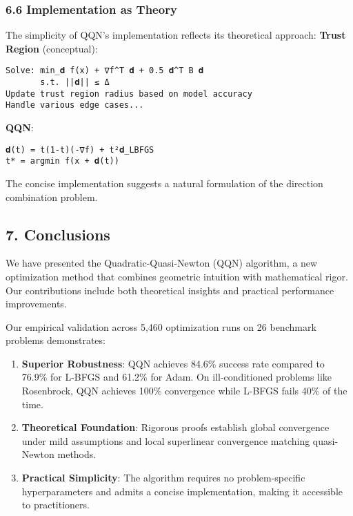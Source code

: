\hypertarget{implementation-as-theory}{%
\subsubsection{6.6 Implementation as Theory}\label{implementation-as-theory}}

The simplicity of QQN's implementation reflects its theoretical approach:
\textbf{Trust Region} (conceptual):

\begin{verbatim}
Solve: min_𝐝 f(x) + ∇f^T 𝐝 + 0.5 𝐝^T B 𝐝
       s.t. ||𝐝|| ≤ Δ
Update trust region radius based on model accuracy
Handle various edge cases...
\end{verbatim}

\textbf{QQN}:

\begin{verbatim}
𝐝(t) = t(1-t)(-∇f) + t²𝐝_LBFGS
t* = argmin f(x + 𝐝(t))
\end{verbatim}

The concise implementation suggests a natural formulation of the direction combination problem.

\hypertarget{conclusions}{%
\subsection{7. Conclusions}\label{conclusions}}

We have presented the Quadratic-Quasi-Newton (QQN) algorithm, a new optimization method that combines geometric
intuition with mathematical rigor. Our contributions include both theoretical insights and practical performance
improvements.

Our empirical validation across 5,460 optimization runs on 26 benchmark problems demonstrates:

\begin{enumerate}
\def\labelenumi{\arabic{enumi}.}
\item
  \textbf{Superior Robustness}: QQN achieves 84.6\% success rate compared to 76.9\% for L-BFGS and 61.2\% for Adam. On
  ill-conditioned problems like Rosenbrock, QQN achieves 100\% convergence while L-BFGS fails 40\% of the time.
\item
  \textbf{Theoretical Foundation}: Rigorous proofs establish global convergence under mild assumptions and local
  superlinear convergence matching quasi-Newton methods.
\item
  \textbf{Practical Simplicity}: The algorithm requires no problem-specific hyperparameters and admits a concise
  implementation, making it accessible to practitioners.
\end{enumerate}


